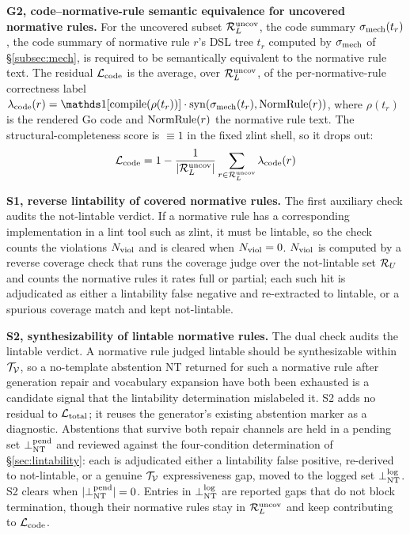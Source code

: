 \noindent\textbf{G2, code--normative-rule semantic equivalence for uncovered normative rules.} For the
uncovered subset $\mathcal{R}_L^{\mathrm{uncov}}$, the code summary $\sigma_{\mathrm{mech}}(t_r)$, the code summary of
normative rule $r$'s DSL tree $t_r$ computed by $\sigma_{\mathrm{mech}}$ of \S\ref{subsec:mech}, is
required to be semantically equivalent to the normative rule text.
The residual $\mathcal{L}_{\mathrm{code}}$ is the average, over $\mathcal{R}_L^{\mathrm{uncov}}$, of the per-normative-rule correctness
label $\lambda_{\mathrm{code}}(r) = \ind[\mathrm{compile}(\rho(t_r))] \cdot
\mathrm{syn}(\smech(t_r), \normrule(r))$, where $\rho(t_r)$ is the rendered Go
code and $\mathrm{NormRule}(r)$ the normative rule text. The structural-completeness score is
$\equiv 1$ in the fixed zlint shell, so it drops out:
\begin{equation}\label{eq:code-res}
  \mathcal{L}_{\mathrm{code}} = 1 - \frac{1}{|\mathcal{R}_L^{\mathrm{uncov}}|}\sum_{r\in\mathcal{R}_L^{\mathrm{uncov}}}\lambda_{\mathrm{code}}(r)
\end{equation}

\noindent\textbf{S1, reverse lintability of covered normative rules.} The first
auxiliary check audits the not-lintable verdict. If a normative rule has a corresponding
implementation in a lint tool such as zlint, it must be lintable, so the check
counts the violations $N_{\mathrm{viol}}$ and is cleared when $N_{\mathrm{viol}} = 0$. $N_{\mathrm{viol}}$ is
computed by a reverse coverage check that runs the coverage judge over
the not-lintable set $\mathcal{R}_U$ and counts the normative rules it rates full or partial; each
such hit is adjudicated as either a lintability false negative and re-extracted to
lintable, or a spurious coverage match and kept not-lintable.

\noindent\textbf{S2, synthesizability of lintable normative rules.} The dual check
audits the lintable verdict. A normative rule judged lintable should be synthesizable
within $\mathcal{T}_{\mathcal{V}}$, so a no-template abstention NT returned for such a
normative rule after generation repair and vocabulary expansion
have both been exhausted is a candidate signal that the lintability determination
mislabeled it.
S2 adds no residual to $\mathcal{L}_{\mathrm{total}}$; it reuses the generator's existing abstention
marker as a diagnostic. Abstentions that survive both repair channels are held
in a pending set $\bot_{\mathrm{NT}}^{\mathrm{pend}}$ and reviewed against the four-condition determination
of \S\ref{sec:lintability}: each is adjudicated either a lintability false
positive, re-derived to not-lintable, or a genuine $\mathcal{T}_{\mathcal{V}}$ expressiveness gap,
moved to the logged set $\bot_{\mathrm{NT}}^{\mathrm{log}}$. S2 clears when $|\bot_{\mathrm{NT}}^{\mathrm{pend}}| = 0$. Entries in
$\bot_{\mathrm{NT}}^{\mathrm{log}}$ are reported gaps that do not block termination, though their normative
rules stay in $\mathcal{R}_L^{\mathrm{uncov}}$ and keep contributing to $\mathcal{L}_{\mathrm{code}}$.

